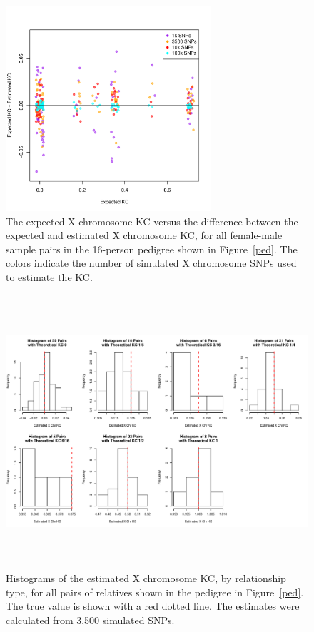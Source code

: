 \documentclass[11pt]{article} %
\begin{document}
\begin{figure}
\begin{center}
\includegraphics[height=3in]{xchrKcEstimatedVsTrueFM.pdf}
\caption{The expected X chromosome KC versus the difference between the expected and estimated X chromosome KC, for all female-male sample pairs in the 16-person pedigree shown in Figure~\ref{ped}. The colors indicate the number of simulated X chromosome SNPs used to estimate the KC.}
\label{xchr_relatedness_MF}
\end{center}
\end{figure}

\begin{figure}
\begin{center}
\includegraphics[height=4in]{histXchrKCByRelType.pdf}
\caption{Histograms of the estimated X chromosome KC, by relationship type, for all pairs of relatives shown in the pedigree in Figure~\ref{ped}. The true value is shown with a red dotted line. The estimates were calculated from 3,500 simulated SNPs.}
\label{xchr_hists}
\end{center}
\end{figure}
\end{document}
